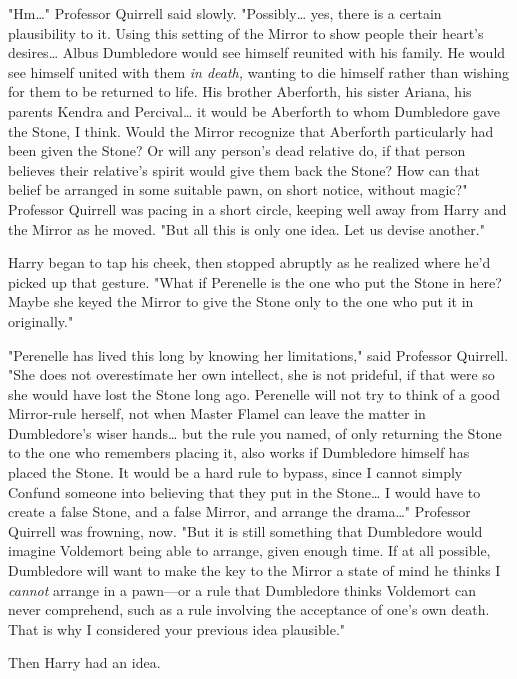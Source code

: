 "Hm{\ldots}" Professor Quirrell said slowly. "Possibly{\ldots} yes, there is a 
certain plausibility to it. Using this setting of the Mirror to show people 
their heart's desires{\ldots} Albus Dumbledore would see himself reunited with 
his family. He would see himself united with them \emph{in death,} wanting to 
die himself rather than wishing for them to be returned to life. His brother 
Aberforth, his sister Ariana, his parents Kendra and Percival{\ldots} it would 
be Aberforth to whom Dumbledore gave the Stone, I think. Would the Mirror 
recognize that Aberforth particularly had been given the Stone? Or will any 
person's dead relative do, if that person believes their relative's spirit 
would give them back the Stone? How can that belief be arranged in some 
suitable pawn, on short notice, without magic?" Professor Quirrell was pacing 
in a short circle, keeping well away from Harry and the Mirror as he moved. 
"But all this is only one idea. Let us devise another."

Harry began to tap his cheek, then stopped abruptly as he realized where he'd 
picked up that gesture. "What if Perenelle is the one who put the Stone in 
here? Maybe she keyed the Mirror to give the Stone only to the one who put it 
in originally."

"Perenelle has lived this long by knowing her limitations," said Professor 
Quirrell. "She does not overestimate her own intellect, she is not prideful, if 
that were so she would have lost the Stone long ago. Perenelle will not try to 
think of a good Mirror-rule herself, not when Master Flamel can leave the 
matter in Dumbledore's wiser hands{\ldots} but the rule you named, of only 
returning the Stone to the one who remembers placing it, also works if 
Dumbledore himself has placed the Stone. It would be a hard rule to bypass, 
since I cannot simply Confund someone into believing that they put in the 
Stone{\ldots} I would have to create a false Stone, and a false Mirror, and 
arrange the drama{\ldots}" Professor Quirrell was frowning, now. "But it is 
still something that Dumbledore would imagine Voldemort being able to arrange, 
given enough time. If at all possible, Dumbledore will want to make the key to 
the Mirror a state of mind he thinks I \emph{cannot} arrange in a pawn---or a 
rule that Dumbledore thinks Voldemort can never comprehend, such as a rule 
involving the acceptance of one's own death. That is why I considered your 
previous idea plausible."

Then Harry had an idea.

